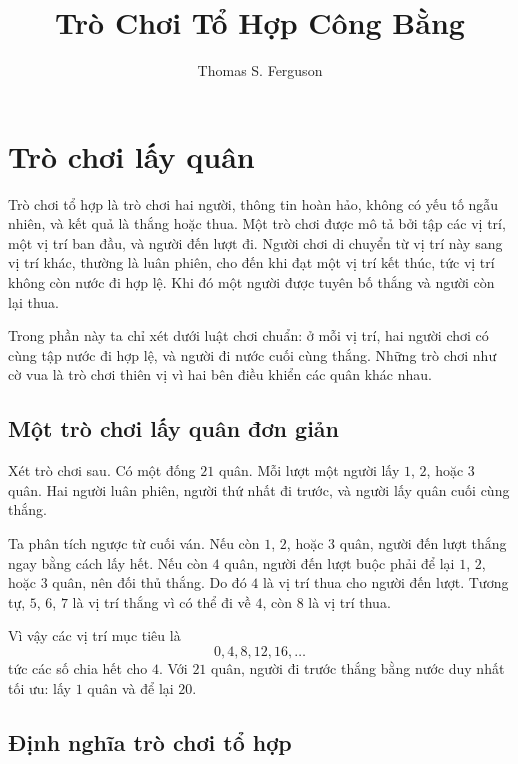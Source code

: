 \documentclass[11pt]{article}
\title{Trò Chơi Tổ Hợp Công Bằng}
\author{Thomas S. Ferguson}
\date{}
\begin{document}
\maketitle


\section{Trò chơi lấy quân}

Trò chơi tổ hợp là trò chơi hai người, thông tin hoàn hảo, không có yếu tố ngẫu
nhiên, và kết quả là thắng hoặc thua. Một trò chơi được mô tả bởi tập các vị
trí, một vị trí ban đầu, và người đến lượt đi. Người chơi di chuyển từ vị trí
này sang vị trí khác, thường là luân phiên, cho đến khi đạt một vị trí kết
thúc, tức vị trí không còn nước đi hợp lệ. Khi đó một người được tuyên bố
thắng và người còn lại thua.

Trong phần này ta chỉ xét  dưới luật chơi chuẩn: ở
mỗi vị trí, hai người chơi có cùng tập nước đi hợp lệ, và người đi nước cuối
cùng thắng. Những trò chơi như cờ vua là trò chơi thiên vị vì hai bên điều
khiển các quân khác nhau.

\subsection{Một trò chơi lấy quân đơn giản}

Xét trò chơi sau. Có một đống \(21\) quân. Mỗi lượt một người lấy \(1\), \(2\),
hoặc \(3\) quân. Hai người luân phiên, người thứ nhất đi trước, và người lấy
quân cuối cùng thắng.

Ta phân tích ngược từ cuối ván. Nếu còn \(1\), \(2\), hoặc \(3\) quân, người
đến lượt thắng ngay bằng cách lấy hết. Nếu còn \(4\) quân, người đến lượt buộc
phải để lại \(1\), \(2\), hoặc \(3\) quân, nên đối thủ thắng. Do đó \(4\) là
vị trí thua cho người đến lượt. Tương tự, \(5\), \(6\), \(7\) là vị trí thắng
vì có thể đi về \(4\), còn \(8\) là vị trí thua.

Vì vậy các vị trí mục tiêu là
\[
  0,4,8,12,16,\ldots
\]
tức các số chia hết cho \(4\). Với \(21\) quân, người đi trước thắng bằng nước
duy nhất tối ưu: lấy \(1\) quân và để lại \(20\).

\subsection{Định nghĩa trò chơi tổ hợp}
\end{document}
